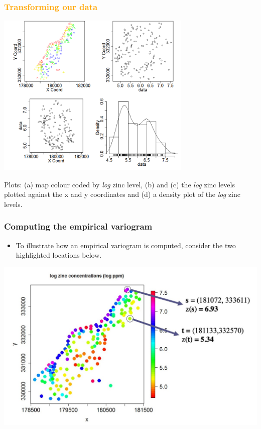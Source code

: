 \documentclass[parskip,12pt]{beamer}
\begin{document}
\begin{frame}
\frametitle{\textcolor{orange}{Transforming our data}}
\vspace{1mm}    
    \begin{center}
     \includegraphics[width=0.7\textwidth]{MeuseLog}
          \end{center}
\vspace{-2mm}          
Plots: (a) map colour coded by \emph{log} zinc level, (b) and (c) the \emph{log} zinc levels plotted against the x and y coordinates and (d) a density plot of the \emph{log} zinc levels.
\end{frame}


\begin{frame}
\frametitle{Computing the empirical variogram}
\vspace{2mm}
 \begin{itemize}
\item To illustrate how an empirical variogram is computed, consider the two highlighted locations below.
\end{itemize}
    \begin{center}
     \includegraphics[width=\textwidth]{MeuseExample}
          \end{center}
\end{frame}
\end{document}
